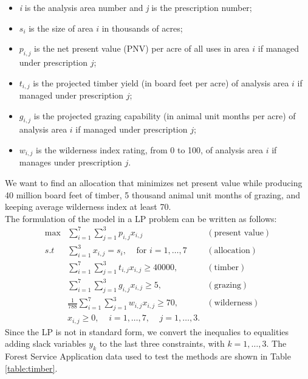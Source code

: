 \documentclass[a4paper,10 pt,titlepage,twoside]{book}
\theoremstyle{plain}
\theoremstyle{definition}
\theoremstyle{remark}
\begin{document}
\begin{itemize}
	\item \textit{i} is the analysis area number and \textit{j} is the prescription number;
	\item $s_{i}$ is the size of area $i$ in thousands of acres;
	\item $p_{i,j}$ is the net present value (PNV) per acre of all uses in area $i$ if managed under prescription $j$;
	\item $t_{i,j}$ is the projected timber yield (in board feet per acre) of analysis area $i$ if managed under prescription $j$;
	\item $g_{i,j}$ is the projected grazing capability (in animal unit months per acre) of analysis area $i$ if managed under prescription $j$;
	\item $w_{i,j}$ is the wilderness index rating, from 0 to 100, of analysis area $i$ if manages under prescription $j$.
\end{itemize}
We want to find an allocation that minimizes net present value while producing 40 million board feet of timber, 5 thousand animal unit months of grazing, and keeping average wilderness index at least 70.\\
The formulation of the model in a LP problem can be written as follows:
\begin{align*}
\max&\sum_{i=1}^{7}\sum_{j=1}^{3} p_{i,j}x_{i,j}&(\text{present value})\\
s.t\;\; & \sum_{i=1}^{3}x_{i,j}=s_{i},\;\;\;\;\text{for }i = 1, \dots,7&(\text{allocation})\\
&\sum_{i=1}^{7}\sum_{j=1}^{3} t_{i,j}x_{i,j}\geq 40000,&(\text{timber})\\
&\sum_{i=1}^{7}\sum_{j=1}^{3} g_{i,j}x_{i,j}\geq5,&(\text{grazing})\\
&\frac{1}{788}\sum_{i=1}^{7}\sum_{j=1}^{3} w_{i,j}x_{i,j}\geq 70,&(\text{wilderness})\\
&x_{i,j}\geq 0, \;\;\;\;i = 1,\dots,7,\;\;\;\;j = 1,\dots,3.
\end{align*}
Since the LP is not in standard form, we convert the inequalies to equalities adding slack variables $y_{k}$ to the last three constraints, with $k = 1, \dots, 3$. The Forest Service Application data used to test the methods are shown in Table \ref{table:timber}.
\end{document}
